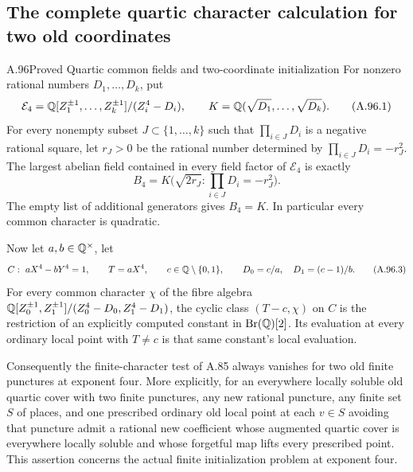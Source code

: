 \subsection{The complete quartic character calculation for two old coordinates}

\begin{statement}{A.96}{Proved}
{Quartic common fields and two-coordinate initialization}
For nonzero rational numbers $D_1,\ldots,D_k$, put
\[
 \mathcal E_4=\mathbb Q[Z_1^{\pm1},\ldots,Z_k^{\pm1}]
                         /(Z_i^4-D_i),\qquad
 K=\mathbb Q(\sqrt{D_1},\ldots,\sqrt{D_k}).
 \tag{A.96.1}
\]
For every nonempty subset $J\subset\{1,\ldots,k\}$ such that
$\prod_{i\in J}D_i$ is a negative rational square, let $r_J>0$
be the rational number determined by
$\prod_{i\in J}D_i=-r_J^2$.
The largest abelian field contained in every field factor
of $\mathcal E_4$ is exactly
\[
              B_4=K\bigl(\sqrt{2r_J}:
                       \prod_{i\in J}D_i=-r_J^2\bigr).
 \tag{A.96.2}
\]
The empty list of additional generators gives $B_4=K$.
In particular every common character is quadratic.

Now let $a,b\in\mathbb Q^\times$, let
\[
        C:\ aX^4-bY^4=1,\qquad T=aX^4,\qquad
        c\in\mathbb Q\setminus\{0,1\},\qquad
        D_0=c/a,\quad D_1=(c-1)/b.
 \tag{A.96.3}
\]
For every common character $\chi$ of the fibre algebra
$\mathbb Q[Z_0^{\pm1},Z_1^{\pm1}]/(Z_0^4-D_0,Z_1^4-D_1)$,
the cyclic class $(T-c,\chi)$ on $C$ is the restriction of
an explicitly computed constant in $\operatorname{Br}(\mathbb Q)[2]$.
Its evaluation at every ordinary local point with $T\ne c$
is that same constant's local evaluation.

Consequently the finite-character test of A.85 always vanishes
for two old finite punctures at exponent four.
More explicitly, for an everywhere locally soluble old quartic
cover with two finite punctures, any new rational puncture, any
finite set $S$ of places, and one prescribed ordinary old local point
at each $v\in S$ avoiding that puncture admit a rational new coefficient whose augmented
quartic cover is everywhere locally soluble and whose
forgetful map lifts every prescribed point.
This assertion concerns the actual finite initialization
problem at exponent four.
\end{statement}
